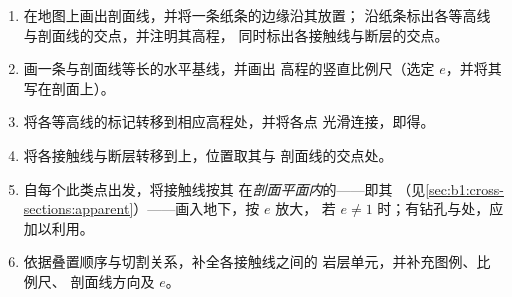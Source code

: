 \begin{method}[由地图绘制地质剖面]\label{met:b1:cross-sections:construct}
\begin{enumerate}
  \item 在地图上画出剖面线，并将一条纸条的边缘沿其放置；
        沿纸条标出各等高线与剖面线的交点，并注明其高程，
        同时标出各接触线与断层的交点。
  \item 画一条与剖面线等长的水平基线，并画出
        高程的竖直比例尺（选定 $e$，并将其写在剖面上）。
  \item 将各等高线的标记转移到相应高程处，并将各点
        光滑连接，即得。
  \item 将各接触线与断层转移到上，位置取其与
        剖面线的交点处。
  \item 自每个此类点出发，将接触线按其
        在\emph{剖面平面内}的——即其
        （见\cref{sec:b1:cross-sections:apparent}）——画入地下，按 $e$ 放大，
        若 $e \ne 1$ 时；有钻孔与处，应加以利用。
  \item 依据叠置顺序与切割关系，补全各接触线之间的
        岩层单元，并补充图例、比例尺、
        剖面线方向及 $e$。
\end{enumerate}
\end{method}

